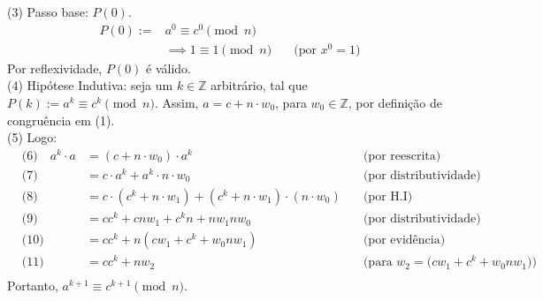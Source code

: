 \begin{enumerate}
		(3) Passo base: $P(0)$.
			\begin{align*}
				P(0) :=& a^0 \equiv c^0 \pmod{n} \\
				&\implies 1 \equiv 1 \pmod{n} &\quad \text{(por $x^0 = 1$)}
			\end{align*}
		Por reflexividade, $P(0)$ é válido. \\
		(4) Hipótese Indutiva: seja um $k \in \mathbb{Z}$ arbitrário, tal que $P(k):= a^k \equiv c^k \pmod{n}$. Assim, $a = c + n \cdot w_0$, para $w_0 \in \mathbb{Z}$, por definição de congruência em (1). \\
		(5) Logo: 
		\begin{align*}
			&\text{(6)} \quad a^k \cdot a &= (c + n \cdot w_0) \cdot a^k &\quad \text{(por reescrita)} \\ 
			&\text{(7)} \quad &= c \cdot a^k + a^k \cdot n \cdot w_0 &\quad \text{(por distributividade)} \\
			&\text{(8)} \quad &= c \cdot (c^k + n \cdot w_1) + (c^k + n \cdot w_1) \cdot (n \cdot w_0) &\quad \text{(por H.I)} \\
			&\text{(9)} \quad &= cc^k + cnw_1 + c^kn + nw_1nw_0 &\quad \text{(por distributividade)} \\
			&\text{(10)} \quad &= cc^k + n(cw_1 + c^k + w_0nw_1) &\quad \text{(por evidência)} \\
			&\text{(11)} \quad &= cc^k + nw_2 &\quad \text{(para $w_2 = (cw_1 + c^k + w_0nw_1$))} \\
		\end{align*}
		Portanto, $a^{k+1} \equiv c^{k+1} \pmod{n}$.
\end{enumerate}


